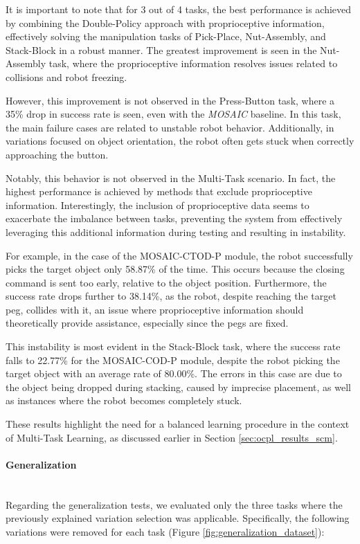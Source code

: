It is important to note that for 3 out of 4 tasks, the best performance is achieved by combining the Double-Policy approach with proprioceptive information, effectively solving the manipulation tasks of Pick-Place, Nut-Assembly, and Stack-Block in a robust manner. The greatest improvement is seen in the Nut-Assembly task, where the proprioceptive information resolves issues related to collisions and robot freezing.

However, this improvement is not observed in the Press-Button task, where a 35\% drop in success rate is seen, even with the \textit{MOSAIC} baseline. In this task, the main failure cases are related to unstable robot behavior. Additionally, in variations focused on object orientation, the robot often gets stuck when correctly approaching the button.

Notably, this behavior is not observed in the Multi-Task scenario. In fact, the highest performance is achieved by methods that exclude proprioceptive information. Interestingly, the inclusion of proprioceptive data seems to exacerbate the imbalance between tasks, preventing the system from effectively leveraging this additional information during testing and resulting in instability.

For example, in the case of the MOSAIC-CTOD-P module, the robot successfully picks the target object only 58.87\% of the time. This occurs because the closing command is sent too early, relative to the object position. Furthermore, the success rate drops further to 38.14\%, as the robot, despite reaching the target peg, collides with it, an issue where proprioceptive information should theoretically provide assistance, especially since the pegs are fixed.

This instability is most evident in the Stack-Block task, where the success rate falls to 22.77\% for the MOSAIC-COD-P module, despite the robot picking the target object with an average rate of 80.00\%. The errors in this case are due to the object being dropped during stacking, caused by imprecise placement, as well as instances where the robot becomes completely stuck.

These results highlight the need for a balanced learning procedure in the context of Multi-Task Learning, as discussed earlier in Section \ref{sec:ocpl_results_scm}.


\paragraph*{Generalization}\mbox{}\\
Regarding the generalization tests, we evaluated only the three tasks where the previously explained variation selection was applicable. Specifically, the following variations were removed for each task (Figure \ref{fig:generalization_dataset}):

